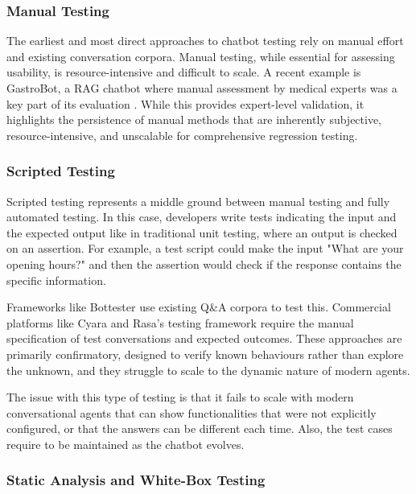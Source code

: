 \subsubsection{Manual Testing}

The earliest and most direct approaches to chatbot testing
rely on manual effort and existing conversation corpora.
Manual testing, while essential for assessing usability,
is resource-intensive and difficult to scale.
A recent example is GastroBot,
a \ac{RAG} chatbot where manual assessment by medical experts
was a key part of its evaluation \autocite{zhouGastroBotChineseGastrointestinal2024}.
While this provides expert-level validation,
it highlights the persistence of manual methods
that are inherently subjective, resource-intensive,
and unscalable for comprehensive regression testing.

\subsubsection{Scripted Testing}

Scripted testing represents a middle ground
between manual testing and fully automated testing.
In this case, developers write tests
indicating the input and the expected output
like in traditional unit testing,
where an output is checked on an assertion.
For example, a test script could make the input
"What are your opening hours?"
and then the assertion would check
if the response contains the specific information.

Frameworks like Bottester
\autocite{vasconcelosBottesterTestingConversational2017}
use existing Q\&A corpora to test this.
Commercial platforms like Cyara \autocite{CyaraBotium}
and Rasa's testing framework \autocite{RasaTest2025}
require the manual specification of test conversations and expected outcomes.
These approaches are primarily confirmatory,
designed to verify known behaviours rather than explore the unknown,
and they struggle to scale to the dynamic nature of modern agents.

The issue with this type of testing
is that it fails to scale with modern conversational agents
that can show functionalities that were not explicitly configured,
or that the answers can be different each time.
Also, the test cases require to be maintained
as the chatbot evolves.

\subsubsection{Static Analysis and White-Box Testing}\label{subsub:static-analysis}

